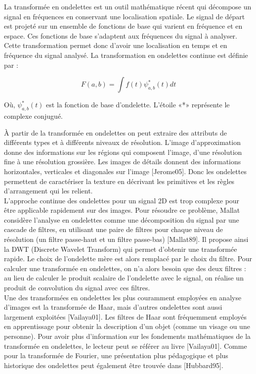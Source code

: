 La transformée en ondelettes est un outil mathématique récent qui décompose un signal en fréquences en conservant une localisation spatiale. Le signal de départ est projeté sur un ensemble de fonctions de base qui varient en fréquence et en espace. Ces fonctions de base s’adaptent aux fréquences du signal à analyser. Cette transformation permet donc d’avoir une localisation en temps et en fréquence du signal analysé. La transformation en ondelettes continue est définie par :

\begin{equation}
	 F(a,b) = {\int }f\left(t\right) \psi_{a,b}^*(t) dt  
\end{equation}

Où, $ \psi_{a,b}^*(t) $ est la fonction de base d’ondelette. L’étoile «*» représente le complexe conjugué.

À partir de la transformée en ondelettes on peut extraire des attributs de différents types et à différents niveaux de résolution. L'image d'approximation donne des informations sur les régions qui composent l'image, d'une résolution fine à une résolution grossière. Les images de
détails donnent des informations horizontales, verticales et diagonales sur l'image [Jerome05]. Donc les ondelettes permettent de caractériser la texture en décrivant les primitives et les règles d'arrangement qui les relient.\\

L’approche continue des ondelettes pour un signal 2D est trop complexe pour être applicable
rapidement sur des images. Pour résoudre ce problème, Mallat considère l'analyse en ondelettes comme une décomposition du signal par une cascade de filtres, en utilisant une
paire de filtres pour chaque niveau de résolution (un filtre passe-haut et un filtre passe-bas) [Mallat89]. Il propose ainsi la DWT (Discrete Wavelet Transform) qui permet d'obtenir une transformée rapide. Le choix de l'ondelette mère est alors remplacé par le choix du filtre. Pour calculer une transformée en ondelettes, on n'a alors besoin que des deux filtres : au lieu de calculer le produit scalaire de l'ondelette avec le signal, on réalise un produit de convolution du signal avec ces filtres.\\

Une des transformées en ondelettes les plus couramment employées en analyse d'images est la
transformée de Haar, mais d'autres ondelettes sont aussi largement exploitées [Vailaya01]. Les filtres de Haar sont fréquemment employés en apprentissage pour obtenir la description d'un objet (comme un visage ou une personne). Pour avoir plus d'information sur les fondements mathématiques de la transformée en ondelettes, le lecteur peut se référer au livre [Vailaya01]. Comme pour la transformée de Fourier, une présentation plus pédagogique et plus historique des ondelettes peut également être trouvée
dans [Hubbard95].

